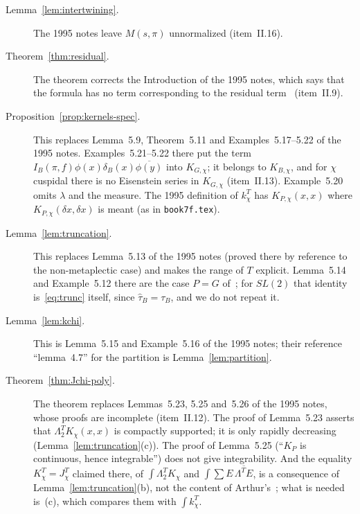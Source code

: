 \begin{description}
\item[Lemma~\ref{lem:intertwining}.] The 1995 notes leave $M(s,\pi)$ unnormalized (item~II.16).

\item[Theorem~\ref{thm:residual}.] The theorem corrects the Introduction of the 1995 notes, which says that the formula has no term corresponding to the residual term~\cite[(5.5)]{LL} (item~II.9).

\item[Proposition~\ref{prop:kernels-spec}.] This replaces Lemma~5.9, Theorem~5.11 and Examples~5.17--5.22 of the 1995
notes. Examples~5.21--5.22 there put the term
$I_B(\pi,f)\phi(x)\delta_B(x)\overline{\phi(y)}$ into $K_{G,\chi}$; it
belongs to $K_{B,\chi}$, and for $\chi$ cuspidal there is no Eisenstein
series in $K_{G,\chi}$ (item~II.13). Example~5.20 omits $\lambda$ and the
measure. The 1995 definition of $k^T_\chi$ has $K_{P,\chi}(x,x)$ where
$K_{P,\chi}(\delta x,\delta x)$ is meant (as in \texttt{book7f.tex}).

\item[Lemma~\ref{lem:truncation}.] This replaces Lemma~5.13 of the 1995 notes (proved there by reference to
the non-metaplectic case) and makes the range of $T$ explicit.
Lemma~5.14 and Example~5.12 there are the case $P=G$ of~\cite[Lemma~1.5]
{A3}; for $SL(2)$ that identity is~\eqref{eq:trunc} itself, since
$\hat\tau_B=\tau_B$, and we do not repeat it.

\item[Lemma~\ref{lem:kchi}.] This is Lemma~5.15 and Example~5.16 of the 1995 notes; their reference
``lemma~4.7'' for the partition is Lemma~\ref{lem:partition}.

\item[Theorem~\ref{thm:Jchi-poly}.] The theorem replaces Lemmas~5.23, 5.25 and~5.26 of the 1995 notes, whose proofs are incomplete (item~II.12). The proof of Lemma~5.23 asserts that $\Lambda^T_2K_\chi(x,x)$ is compactly supported; it is only rapidly decreasing (Lemma~\ref{lem:truncation}(c)). The proof of Lemma~5.25 (``$K_P$ is continuous, hence integrable'') does not give integrability. And the equality $K^T_\chi=J^T_\chi$ claimed there, of $\int\Lambda^T_2K_\chi$ and $\int\sum E\,\overline{\Lambda^TE}$, is a consequence of Lemma~\ref{lem:truncation}(b), not the content of Arthur's~\cite[Lemma~2.4]{A3}; what is needed is~(c), which compares them with $\int k^T_\chi$.


\end{description}
